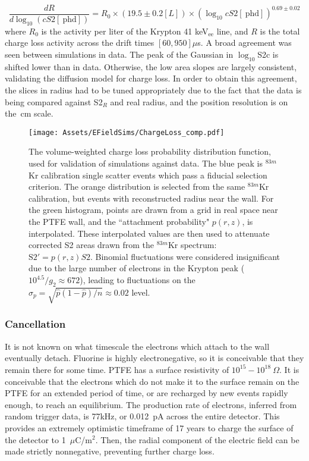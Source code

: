 \begin{equation}
    \frac{dR}{d\log_{10}(cS2  [\mathrm{~phd} ])}  = R_0 \times (19.5 \pm 0.2 [L]) \times  (\log_{10} cS2 [\mathrm{~phd}])^{0.69 \pm 0.02}
\end{equation}
\noindent
where $R_0$ is the activity per liter of the Krypton 41 keV$_{\mathrm{ee}}$ line, and $R$ is the total charge loss  activity across the drift times $[60,950]\mu$s.
A broad agreement was seen between simulations in data.
The peak of the Gaussian in $\log_{10}$S2c is shifted lower than in data.
Otherwise, the low area slopes are largely consistent, validating the diffusion model for charge loss.
In order to obtain this agreement, the slices in radius had to be tuned appropriately due to the fact that the data is being compared against S2$_R$ and real radius, and the position resolution is on the~cm scale.

\begin{figure}
    \centering
    \texttt{[image: Assets/EFieldSims/ChargeLoss\_comp.pdf]}
    \caption[The volume-weighted charge loss probability distribution function, used for  validation of simulations against data.]%
    {The volume-weighted charge loss probability distribution function, used for  validation of simulations against data.
    The blue peak is $^{83m}$Kr calibration single scatter events which pass a fiducial selection criterion.
    The orange distribution is selected from the same $^{83m}$Kr calibration, but events with reconstructed radius near the wall. 
    For the green histogram, points are drawn from a grid in real space near the PTFE wall, and the ``attachment probability" $p(r,z)$, is interpolated.
    These interpolated values are then used to attenuate corrected S2 areas drawn from the $^{83m}$Kr spectrum: $\mathrm{S2}' = p(r,z) S2$.
    Binomial fluctuations were considered insignificant due to the large number of electrons in the Krypton peak ($10^{4.5}/g_2 \approx 672$), leading to fluctuations on the $\sigma_p = \sqrt{\hat p (1- \hat p) /n } \approx  0.02$ level.
    }
    \label{fig:charge_loss_validation}
\end{figure}

\subsubsection{Cancellation}
It is not known on what timescale the electrons which attach to the wall eventually detach.
Fluorine is highly electronegative, so it is conceivable that they remain there for some time.
PTFE has a surface resistivity of $10^{15}-10^{18}~\Omega$\cite{noauthor_overview_nodate}.
It is conceivable that the electrons which do not make it to the surface remain on the PTFE for an extended period of time, or are recharged by new events rapidly enough, to reach an equilibrium.
The production rate of electrons, inferred from random trigger data, is 77kHz, or 0.012~pA across the entire detector.
This provides an extremely optimistic timeframe of 17 years to charge the surface of the detector to 1~$\mu$C/m$^2$.
Then, the radial component of the electric field can be made strictly nonnegative, preventing further charge loss.


